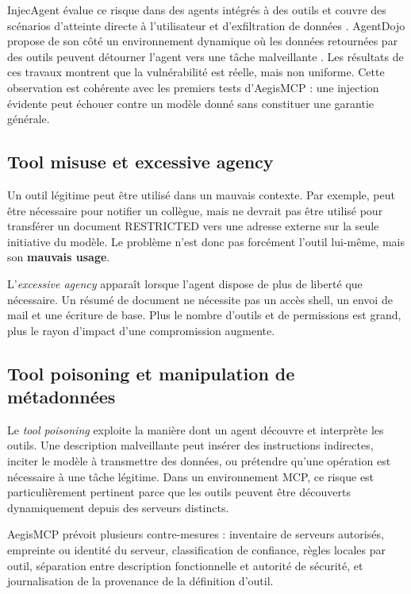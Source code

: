 InjecAgent évalue ce risque dans des agents intégrés à des outils et couvre des scénarios d'atteinte directe à l'utilisateur et d'exfiltration de données \cite{injecagent}. AgentDojo propose de son côté un environnement dynamique où les données retournées par des outils peuvent détourner l'agent vers une tâche malveillante \cite{agentdojo}. Les résultats de ces travaux montrent que la vulnérabilité est réelle, mais non uniforme. Cette observation est cohérente avec les premiers tests d'AegisMCP : une injection évidente peut échouer contre un modèle donné sans constituer une garantie générale.

\subsection{Tool misuse et excessive agency}

Un outil légitime peut être utilisé dans un mauvais contexte. Par exemple,  peut être nécessaire pour notifier un collègue, mais ne devrait pas être utilisé pour transférer un document RESTRICTED vers une adresse externe sur la seule initiative du modèle. Le problème n'est donc pas forcément l'outil lui-même, mais son \textbf{mauvais usage}.

L'\textit{excessive agency} apparaît lorsque l'agent dispose de plus de liberté que nécessaire. Un résumé de document ne nécessite pas un accès shell, un envoi de mail et une écriture de base. Plus le nombre d'outils et de permissions est grand, plus le rayon d'impact d'une compromission augmente.

\subsection{Tool poisoning et manipulation de métadonnées}

Le \textit{tool poisoning} exploite la manière dont un agent découvre et interprète les outils. Une description malveillante peut insérer des instructions indirectes, inciter le modèle à transmettre des données, ou prétendre qu'une opération est nécessaire à une tâche légitime. Dans un environnement MCP, ce risque est particulièrement pertinent parce que les outils peuvent être découverts dynamiquement depuis des serveurs distincts.

AegisMCP prévoit plusieurs contre-mesures : inventaire de serveurs autorisés, empreinte ou identité du serveur, classification de confiance, règles locales par outil, séparation entre description fonctionnelle et autorité de sécurité, et journalisation de la provenance de la définition d'outil.

